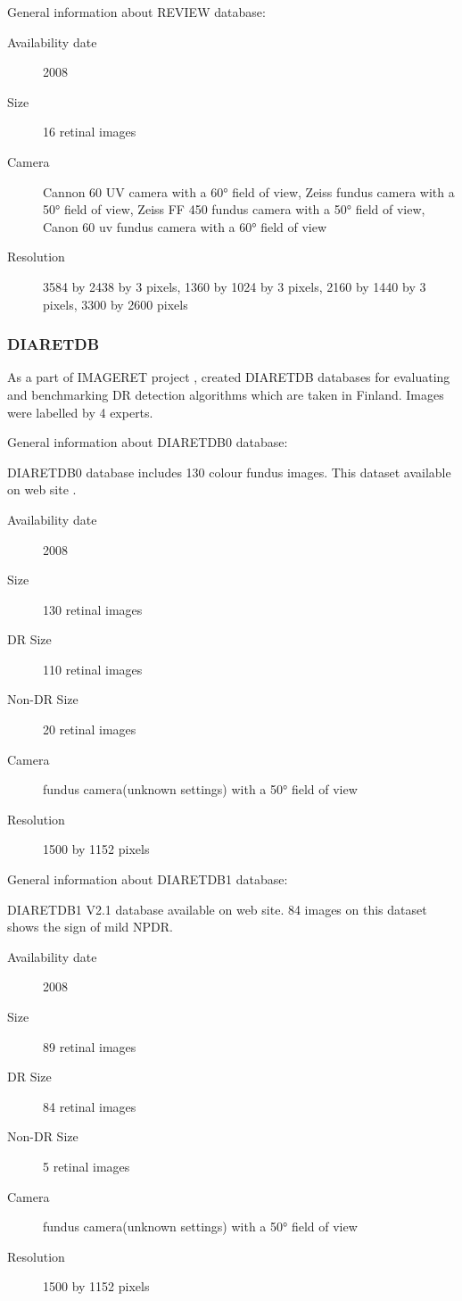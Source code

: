 General information about REVIEW database:
\begin{description}
    \item[Availability date] 2008
    \item[Size] 16 retinal images
    \item[Camera] Cannon 60 UV camera with a 60° field of view, Zeiss fundus camera with a 50° field of view, Zeiss  FF 450 fundus  camera with a 50°  field of view, Canon 60 uv fundus  camera with a 60° field of view
    \item[Resolution] 3584 by 2438 by 3 pixels, 1360 by 1024 by 3 pixels, 2160 by 1440 by 3 pixels, 3300 by 2600 pixels
\end{description}

\subsubsection{DIARETDB}

As a part of IMAGERET project \citep{IMAGERET}, \citet{kauppi2013constructing} created DIARETDB databases \citep{DIARETDB0, DIARETDB1V2_1} for evaluating and benchmarking DR detection algorithms which are taken in Finland. Images were labelled by 4 experts.

General information about DIARETDB0 database:

DIARETDB0 database includes 130 colour fundus images. This dataset available on \citet{DIARETDB0} web site \citep{kauppi2006diaretdb0}.

\begin{description}
    \item[Availability date] 2008
    \item[Size] 130 retinal images
    \item[DR Size] 110 retinal images
    \item[Non-DR Size] 20 retinal images
    \item[Camera] fundus camera(unknown settings) with a 50° field of view
    \item[Resolution] 1500 by 1152 pixels
\end{description}

General information about DIARETDB1 database:

DIARETDB1 V2.1 database \citep{kauppi2007diaretdb1} available on \citet{DIARETDB1V2_1} web site. 84 images on this dataset shows the sign of mild NPDR. 

\begin{description}
    \item[Availability date] 2008
    \item[Size] 89 retinal images
    \item[DR Size] 84 retinal images
    \item[Non-DR Size] 5 retinal images
    \item[Camera] fundus camera(unknown settings) with a 50° field of view
    \item[Resolution] 1500 by 1152 pixels
\end{description}


